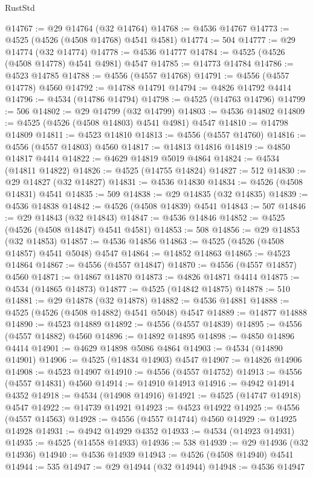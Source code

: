 \begin{lexlean}{RustStd}
\begin{coremodule}
@14767 := @29 @14764 (@32 @14764)
@14768 := @4536 @14767
@14773 := @4525 (@4526 (@4508 @14768) @4541 @4581)
@14774 := 504
@14777 := @29 @14774 (@32 @14774)
@14778 := @4536 @14777
@14784 := @4525 (@4526 (@4508 @14778) @4541 @4981) @4547
@14785 := @14773 @14784
@14786 := @4523 @14785
@14788 := @4556 (@4557 @14768)
@14791 := @4556 (@4557 @14778) @4560
@14792 := @14788 @14791
@14794 := @4826 @14792 @4414
@14796 := @4534 (@14786 @14794)
@14798 := @4525 (@14763 @14796)
@14799 := 506
@14802 := @29 @14799 (@32 @14799)
@14803 := @4536 @14802
@14809 := @4525 (@4526 (@4508 @14803) @4541 @4981) @4547
@14810 := @14798 @14809
@14811 := @4523 @14810
@14813 := @4556 (@4557 @14760)
@14816 := @4556 (@4557 @14803) @4560
@14817 := @14813 @14816
@14819 := @4850 @14817 @4414
@14822 := @4629 @14819 @5019 @4864
@14824 := @4534 (@14811 @14822)
@14826 := @4525 (@14755 @14824)
@14827 := 512
@14830 := @29 @14827 (@32 @14827)
@14831 := @4536 @14830
@14834 := @4526 (@4508 @14831) @4541
@14835 := 509
@14838 := @29 @14835 (@32 @14835)
@14839 := @4536 @14838
@14842 := @4526 (@4508 @14839) @4541
@14843 := 507
@14846 := @29 @14843 (@32 @14843)
@14847 := @4536 @14846
@14852 := @4525 (@4526 (@4508 @14847) @4541 @4581)
@14853 := 508
@14856 := @29 @14853 (@32 @14853)
@14857 := @4536 @14856
@14863 := @4525 (@4526 (@4508 @14857) @4541 @5048) @4547
@14864 := @14852 @14863
@14865 := @4523 @14864
@14867 := @4556 (@4557 @14847)
@14870 := @4556 (@4557 @14857) @4560
@14871 := @14867 @14870
@14873 := @4826 @14871 @4414
@14875 := @4534 (@14865 @14873)
@14877 := @4525 (@14842 @14875)
@14878 := 510
@14881 := @29 @14878 (@32 @14878)
@14882 := @4536 @14881
@14888 := @4525 (@4526 (@4508 @14882) @4541 @5048) @4547
@14889 := @14877 @14888
@14890 := @4523 @14889
@14892 := @4556 (@4557 @14839)
@14895 := @4556 (@4557 @14882) @4560
@14896 := @14892 @14895
@14898 := @4850 @14896 @4414
@14901 := @4629 @14898 @5086 @4864
@14903 := @4534 (@14890 @14901)
@14906 := @4525 (@14834 @14903) @4547
@14907 := @14826 @14906
@14908 := @4523 @14907
@14910 := @4556 (@4557 @14752)
@14913 := @4556 (@4557 @14831) @4560
@14914 := @14910 @14913
@14916 := @4942 @14914 @4352
@14918 := @4534 (@14908 @14916)
@14921 := @4525 (@14747 @14918) @4547
@14922 := @14739 @14921
@14923 := @4523 @14922
@14925 := @4556 (@4557 @14563)
@14928 := @4556 (@4557 @14744) @4560
@14929 := @14925 @14928
@14931 := @4942 @14929 @4352
@14933 := @4534 (@14923 @14931)
@14935 := @4525 (@14558 @14933)
@14936 := 538
@14939 := @29 @14936 (@32 @14936)
@14940 := @4536 @14939
@14943 := @4526 (@4508 @14940) @4541
@14944 := 535
@14947 := @29 @14944 (@32 @14944)
@14948 := @4536 @14947

\end{coremodule}
\end{lexlean}
